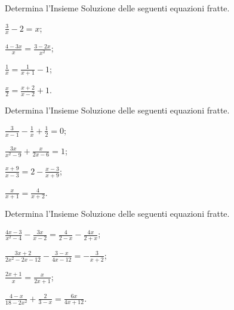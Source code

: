 \begin{esercizio}[\Ast]
\label{ese:3.39}
Determina l'Insieme Soluzione delle seguenti equazioni fratte.
\begin{multicols}{2}
\begin{enumeratea}
\item $\frac{3}{x}-2 = x$;
\item $\frac{4-3 x}{x}=\frac{3-2 x}{x^{2}}$;
\item $\frac{1}{x} = \frac{1}{x + 1}-1$;
\item $\frac{x}{2} = \frac{x + 2}{x-2} + 1$.
\end{enumeratea}
\end{multicols}
\end{esercizio}

\begin{esercizio}[\Ast]
\label{ese:3.40}
Determina l'Insieme Soluzione delle seguenti equazioni fratte.
\begin{multicols}{2}
\begin{enumeratea}
\item $\frac{3}{x-1}-\frac{1}{x} + \frac{1}{2} = 0$;
\item $\frac{3 x}{x^{2}-9} + \frac{x}{2 x-6}=1$;
\item $\frac{x + 9}{x-3}=2-\frac{x-3}{x + 9}$;
\item $\frac{x}{x + 1} = \frac{4}{x + 2}$.
\end{enumeratea}
\end{multicols}
\end{esercizio}

 \begin{esercizio}[\Ast]
\label{ese:3.41}
Determina l'Insieme Soluzione delle seguenti equazioni fratte.
\begin{multicols}{2}
\begin{enumeratea}
\item $\frac{4 x-3}{x^{2}-4}-\frac{3 x}{x-2} = \frac{4}{2-x}-\frac{4 x}{2 + x}$;
\item $\frac{3 x + 2}{2 x^{2}-2 x-12}-\frac{3-x}{4 x-12} = - \frac{3}{x + 2}$;
\item $\frac{2 x + 1}{x} = \frac{x}{2 x + 1}$;
\item $\frac{4-x}{18-2 x^{2}} + \frac{2}{3-x} = \frac{6 x}{4 x +12}$.
\end{enumeratea}
\end{multicols}
 \end{esercizio}

